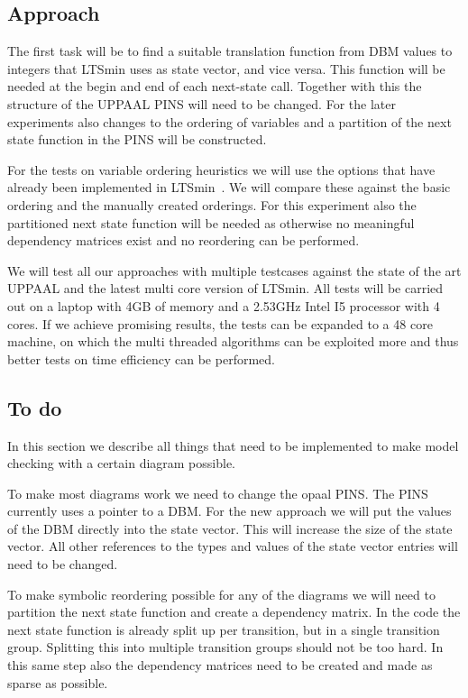 \documentclass[11pt]{article}
\begin{document}
\subsection{Approach}
The first task will be to find a suitable translation function from DBM values to integers that LTSmin uses as state vector, and vice versa. This function will be needed at the begin and end of each next-state call. Together with this the structure of the UPPAAL PINS will need to be changed. For the later experiments also changes to the ordering of variables and a partition of the next state function in the PINS will be constructed. 

For the tests on variable ordering heuristics we will use the options that have already been implemented in LTSmin~\cite{rwcmatrices}. We will compare these against the basic ordering and the manually created orderings. For this experiment also the partitioned next state function will be needed as otherwise no meaningful dependency matrices exist and no reordering can be performed. 

We will test all our approaches with multiple testcases against the state of the art UPPAAL and the latest multi core version of LTSmin. All tests will be carried out on a laptop with 4GB of memory and a 2.53GHz Intel I5 processor with 4 cores. If we achieve promising results, the tests can be expanded to a 48 core machine, on which the multi threaded algorithms can be exploited more and thus better tests on time efficiency can be performed.

\subsection{To do}
In this section we describe all things that need to be implemented to make model checking with a certain diagram possible. 

To make most diagrams work we need to change the opaal PINS. The PINS currently uses a pointer to a DBM. For the new approach we will put the values of the DBM directly into the state vector. This will increase the size of the state vector. All other references to the types and values of the state vector entries will need to be changed. 

To make symbolic reordering possible for any of the diagrams we will need to partition the next state function and create a dependency matrix. In the code the next state function is already split up per transition, but in a single transition group. Splitting this into multiple transition groups should not be too hard. In this same step also the dependency matrices need to be created and made as sparse as possible.
\end{document}

